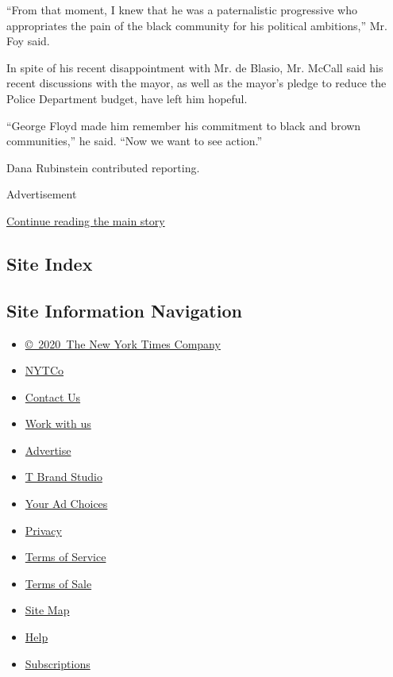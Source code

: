 ``From that moment, I knew that he was a paternalistic progressive who
appropriates the pain of the black community for his political
ambitions,'' Mr. Foy said.

In spite of his recent disappointment with Mr. de Blasio, Mr. McCall
said his recent discussions with the mayor, as well as the mayor's
pledge to reduce the Police Department budget, have left him hopeful.

``George Floyd made him remember his commitment to black and brown
communities,'' he said. ``Now we want to see action.''

Dana Rubinstein contributed reporting.

Advertisement

\protect\hyperlink{after-bottom}{Continue reading the main story}

\hypertarget{site-index}{%
\subsection{Site Index}\label{site-index}}

\hypertarget{site-information-navigation}{%
\subsection{Site Information
Navigation}\label{site-information-navigation}}

\begin{itemize}
\tightlist
\item
  \href{https://help.nytimes3xbfgragh.onion/hc/en-us/articles/115014792127-Copyright-notice}{©~2020~The
  New York Times Company}
\end{itemize}

\begin{itemize}
\tightlist
\item
  \href{https://www.nytco.com/}{NYTCo}
\item
  \href{https://help.nytimes3xbfgragh.onion/hc/en-us/articles/115015385887-Contact-Us}{Contact
  Us}
\item
  \href{https://www.nytco.com/careers/}{Work with us}
\item
  \href{https://nytmediakit.com/}{Advertise}
\item
  \href{http://www.tbrandstudio.com/}{T Brand Studio}
\item
  \href{https://www.nytimes3xbfgragh.onion/privacy/cookie-policy\#how-do-i-manage-trackers}{Your
  Ad Choices}
\item
  \href{https://www.nytimes3xbfgragh.onion/privacy}{Privacy}
\item
  \href{https://help.nytimes3xbfgragh.onion/hc/en-us/articles/115014893428-Terms-of-service}{Terms
  of Service}
\item
  \href{https://help.nytimes3xbfgragh.onion/hc/en-us/articles/115014893968-Terms-of-sale}{Terms
  of Sale}
\item
  \href{https://spiderbites.nytimes3xbfgragh.onion}{Site Map}
\item
  \href{https://help.nytimes3xbfgragh.onion/hc/en-us}{Help}
\item
  \href{https://www.nytimes3xbfgragh.onion/subscription?campaignId=37WXW}{Subscriptions}
\end{itemize}
